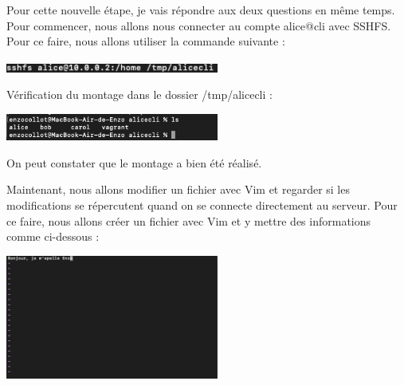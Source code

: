 \documentclass[12pt]{article}
\begin{document}
\vspace{0.3cm}

Pour cette nouvelle étape, je vais répondre aux deux questions en même temps. Pour commencer, nous allons nous connecter au compte alice@cli avec SSHFS. Pour ce faire, nous allons utiliser la commande suivante :

\vspace{0.3cm}

\begin{center}
  \includegraphics[width=7cm]{Images-Client-SSH/Image-TD-SSH-4/sshfs.png}
\end{center}

\vspace{0.3cm}

Vérification du montage dans le dossier /tmp/alicecli :

\vspace{0.3cm}

\begin{center}
  \includegraphics[width=7cm]{Images-Client-SSH/Image-TD-SSH-4/montage-sshfs.png}
\end{center}

\vspace{0.3cm}

On peut constater que le montage a bien été réalisé.

\newpage

\vspace{0.3cm}

Maintenant, nous allons modifier un fichier avec Vim et regarder si les modifications se répercutent quand on se connecte directement au serveur. Pour ce faire, nous allons créer un fichier avec Vim et y mettre des informations comme ci-dessous :

\vspace{0.3cm}

\begin{center}
  \includegraphics[width=7cm]{Images-Client-SSH/Image-TD-SSH-4/Modification-fichier-vim.png}
\end{center}
\end{document}
